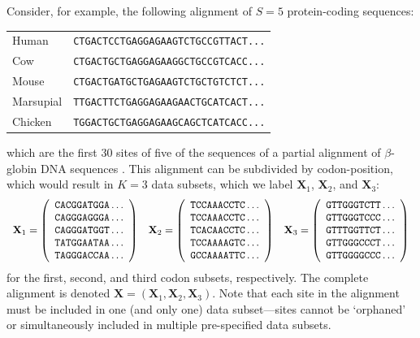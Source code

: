 \documentclass[11pt]{article}
\begin{document}
Consider, for example, the following alignment of $S=5$ protein-coding sequences:
\begin{center}
\begin{tabular}{ll}
Human      & {\tt CTGACTCCTGAGGAGAAGTCTGCCGTTACT...} \\
Cow        & {\tt CTGACTGCTGAGGAGAAGGCTGCCGTCACC...} \\
Mouse      & {\tt CTGACTGATGCTGAGAAGTCTGCTGTCTCT...} \\
Marsupial  & {\tt TTGACTTCTGAGGAGAAGAACTGCATCACT...} \\
Chicken    & {\tt TGGACTGCTGAGGAGAAGCAGCTCATCACC...}
\end{tabular}
\end{center}
which are the first $30$ sites of five of the sequences of a partial alignment of $\beta$-globin DNA sequences \citep{yang00}.
This alignment can be subdivided by codon-position, which would result in $K=3$ data subsets, which
we label ${\mathbf X}_1$, ${\mathbf X}_2$, and ${\mathbf X}_3$:
$$
\begin{array}{ccc}
{\mathbf X}_1 = \left( \begin{array}{c}
{\tt CACGGATGGA} \ldots \\
{\tt CAGGGAGGGA} \ldots \\
{\tt CAGGGATGGT} \ldots \\
{\tt TATGGAATAA} \ldots \\
{\tt TAGGGACCAA} \ldots \\
\end{array} \right) 
&
{\mathbf X}_2 = \left( \begin{array}{c}
{\tt TCCAAACCTC} \ldots \\
{\tt TCCAAACCTC} \ldots \\
{\tt TCACAACCTC} \ldots \\
{\tt TCCAAAAGTC} \ldots \\
{\tt GCCAAAATTC} \ldots \\
\end{array} \right) 
&
{\mathbf X}_3 = \left( \begin{array}{c}
{\tt GTTGGGTCTT} \ldots \\
{\tt GTTGGGTCCC} \ldots \\
{\tt GTTTGGTTCT} \ldots \\
{\tt GTTGGGCCCT} \ldots \\
{\tt GTTGGGGCCC} \ldots \\
\end{array} \right) 
\end{array}
$$
for the first, second, and third codon subsets, respectively.
The complete alignment is denoted ${\mathbf X} = ({\mathbf X}_1,{\mathbf X}_2,{\mathbf X}_3)$.
Note that each site in the alignment must be included in one (and only one) data subset---sites cannot be `orphaned' or simultaneously included in multiple pre-specified data subsets.
\end{document}
